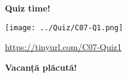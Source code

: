 \documentclass[xcolor=pdftex,romanian,colorlinks]{beamer}
\begin{document}
%
%
%
%
%

\begin{frame}
  \vfill
  \centering

\textbf{\large \alert{Quiz time!}}

\texttt{[image: ../Quiz/C07-Q1.png]}

 \url{https://tinyurl.com/C07-Quiz1}
  \vfill
\end{frame}

\begin{frame}
  \vfill
  \centering

\textbf{Vacanță plăcută!}

  \vfill
\end{frame}
\end{document}
